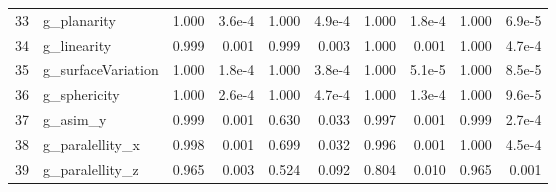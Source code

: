 \documentclass[final,3p,times,twocolumn]{elsarticle}
\begin{document}
\begin{table}[t!]
\begin{adjustbox}{max width=\textwidth}
\begin{tabular}{llrrrrrrrr}
    33 & g\_planarity & 1.000 & 3.6e-4 & 1.000 & 4.9e-4 & 1.000 & 1.8e-4 & 1.000 & 6.9e-5 \\
    34 & g\_linearity & 0.999 & 0.001 & 0.999 & 0.003 & 1.000 & 0.001 & 1.000 & 4.7e-4 \\
    35 & g\_surfaceVariation & 1.000 & 1.8e-4 & 1.000 & 3.8e-4 & 1.000 & 5.1e-5 & 1.000 & 8.5e-5 \\
    36 & g\_sphericity & 1.000 & 2.6e-4 & 1.000 & 4.7e-4 & 1.000 & 1.3e-4 & 1.000 & 9.6e-5 \\
    37 & g\_asim\_y & 0.999 & 0.001 & 0.630 & 0.033 & 0.997 & 0.001 & 0.999 & 2.7e-4 \\
    38 & g\_paralellity\_x & 0.998 & 0.001 & 0.699 & 0.032 & 0.996 & 0.001 & 1.000 & 4.5e-4 \\
    39 & g\_paralellity\_z & 0.965 & 0.003 & 0.524 & 0.092 & 0.804 & 0.010 & 0.965 & 0.001 \\
    \bottomrule
    \end{tabular}
    \end{adjustbox}
\end{table}
\end{document}
